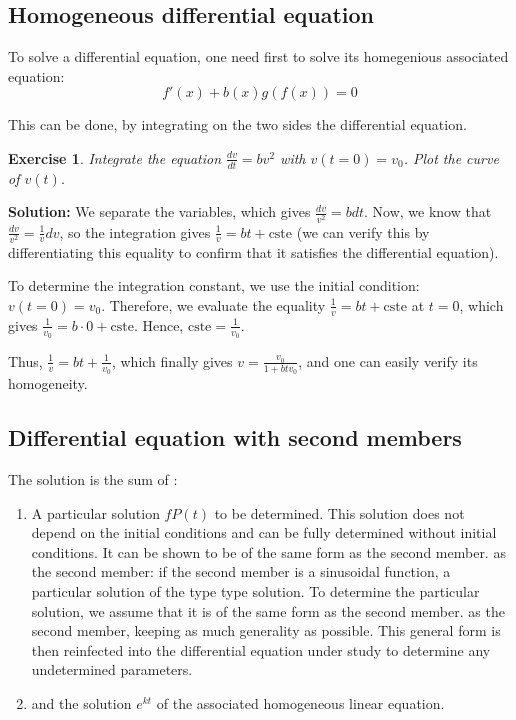 \documentclass[french,12pt,a4paper]{book}
\newtheorem{exo}{Exercise}[chapter]
\numberwithin{equation}{chapter}
\begin{document}
\subsection{Homogeneous differential equation}

To solve a differential equation, one need first to solve its homegenious associated equation:
\begin{equation}
f'(x) +  b(x)g(f(x)) =0
\end{equation}

This can be done, by integrating on the two sides the differential equation. 

\begin{exo}
Integrate the equation $\frac{dv}{dt} = bv^2$ with $v(t = 0) = v_0$. Plot the curve of $v(t)$.
\end{exo}

\textbf{Solution:} We separate the variables, which gives $\frac{dv}{v^2} = bdt$. Now, we know that $\frac{dv}{v^2} = \frac{1}{v}dv$, so the integration gives $\frac{1}{v} = bt + \text{cste}$ (we can verify this by differentiating this equality to confirm that it satisfies the differential equation).

To determine the integration constant, we use the initial condition: $v(t = 0) = v_0$. Therefore, we evaluate the equality $\frac{1}{v} = bt + \text{cste}$ at $t = 0$, which gives $\frac{1}{v_0} = b \cdot 0 + \text{cste}$. Hence, $\text{cste} = \frac{1}{v_0}$.

Thus, $\frac{1}{v} = bt + \frac{1}{v_0}$, which finally gives $v = \frac{v_0}{1 + btv_0}$, and one can easily verify its homogeneity.

\subsection{Differential equation with second members}

The solution is the sum of :
\begin{enumerate}
\item A particular solution $f P (t)$ to be determined. This solution does not depend on the initial conditions and
can be fully determined without initial conditions. It can be shown to be of the same form as the second member.
as the second member: if the second member is a sinusoidal function, a particular solution of the type
type solution. To determine the particular solution, we assume that it is of the same form as the second member.
as the second member, keeping as much generality as possible. This general form is then reinfected into
the differential equation under study to determine any undetermined parameters.
\item and the solution $e^{kt}$ of the associated homogeneous linear equation.
\end{enumerate}
\end{document}
